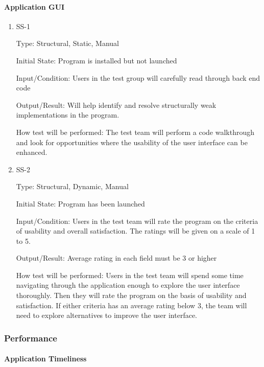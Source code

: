 \documentclass[12pt, titlepage]{article}
\begin{document}
\paragraph{Application GUI}

\begin{enumerate}

\item{SS-1\\}

Type: Structural, Static, Manual
					
Initial State: Program is installed but not launched
					
Input/Condition: Users in the test group will carefully read through back end code
					
Output/Result: Will help identify and resolve structurally weak implementations in the program.
					
How test will be performed: The test team will perform a code walkthrough and look for opportunities where the usability of the user interface can be enhanced.
					
\item{SS-2\\}

Type: Structural, Dynamic, Manual
					
Initial State: Program has been launched 
					
Input/Condition: Users in the test team will rate the program on the criteria of usability and overall satisfaction. The ratings will be given on a scale of 1 to 5.
					
Output/Result: Average rating in each field must be 3 or higher
					
How test will be performed: Users in the test team will spend some time navigating through the application enough to explore the user interface thoroughly. Then they will rate the program on the basis of usability and satisfaction. If either criteria has an average rating below 3, the team will need to explore alternatives to improve the user interface.

\end{enumerate}

\subsubsection{Performance}

\paragraph{Application Timeliness}
\end{document}
